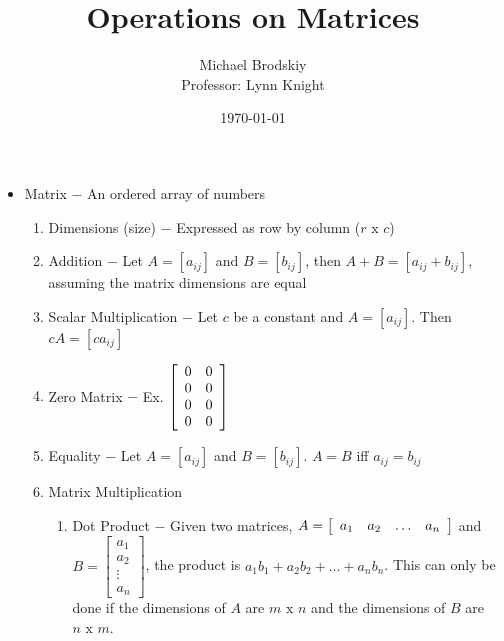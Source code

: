 \documentclass[12pt]{article}
\title{Operations on Matrices}
\date{\today}
\author{Michael Brodskiy\\ \small Professor: Lynn Knight}
\begin{document}
\maketitle

\begin{itemize}

  \item Matrix $-$ An ordered array of numbers

    \begin{enumerate}

      \item Dimensions (size) $-$ Expressed as row by column ($r \text{ x } c$)

      \item Addition $-$ Let $A=[a_{ij}]$ and $B=[b_{ij}]$, then $A+B=[a_{ij}+b_{ij}]$, assuming the matrix dimensions are equal

      \item Scalar Multiplication $-$ Let $c$ be a constant and $A=[a_{ij}]$. Then $cA=[ca_{ij}]$

      \item Zero Matrix $-$ Ex. $\left[\begin{array}{l l} 0 & 0 \\ 0 & 0 \\ 0 & 0 \\ 0 & 0 \\ \end{array}\right]$

      \item Equality $-$ Let $A=[a_{ij}]$ and $B=[b_{ij}]$. $A=B$ iff $a_{ij}=b_{ij}$

      \item Matrix Multiplication

        \begin{enumerate}

          \item Dot Product $-$ Given two matrices, $A=\left[\begin{array}{l l l l} a_1 & a_2 & \dots & a_n \end{array}\right]$ and $B=\left[ \begin{array}{l} a_1 \\ a_2 \\ \vdots \\ a_n \end{array}\right]$, the product is $a_1b_1+a_2b_2+\dots+a_nb_n$. This can only be done if the dimensions of $A$ are $m\text{ x }n$ and the dimensions of $B$ are $n\text{ x }m$.


\end{enumerate}
\end{enumerate}
\end{itemize}
\end{document}
